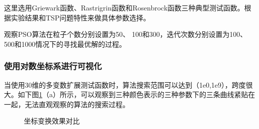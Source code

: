 \documentclass[lang=cn,11pt]{elegantpaper}
\begin{document}
这里选用Griewark函数、Rastrigrin函数和Rosenbrock函数三种典型测试函数。根据实验结果和TSP问题特性来做具体参数选择。

观察PSO算法在粒子个数分别设置为50、 100和300，迭代次数分别设置为100、 500和1000情况下的寻找最优解的过程。
\subsubsection{使用对数坐标系进行可视化}
当使用30维的多变数扩展测试函数时，算法搜索范围可以达到（1e0,1e9），跨度很大。如下图\ref{fig:坐标变换效果对比}（a）所示，可以观察到三种颜色表示的三种参数下的三条曲线紧贴在一起，无法直观观察的算法的搜索过程。

\begin{figure}[ht]
\centering    %
\caption{坐标变换效果对比} %
\label{fig:坐标变换效果对比}  %
\end{figure}
\end{document}
